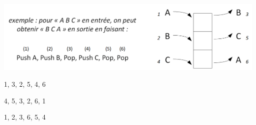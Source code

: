 \documentclass[11pt,a4paper]{article}
\begin{document}

\begin{center}

\centerline{
\includegraphics[scale=0.75]{img/exemple_ordre_pile_longueur_2.png}
}

\end{center}



\begin{center}

\begin{large}
1, 3, 2, 5, 4, 6
\end{large}
%
\begin{center}
\LigneReponseTrois
\end{center}


\begin{large}
4, 5, 3, 2, 6, 1
\end{large}
%
\begin{center}
\LigneReponseTrois
\end{center}

\begin{large}
1, 2, 3, 6, 5, 4
\end{large}
%
\begin{center}
\LigneReponseTrois
\end{center}

\end{center}
\end{document}
